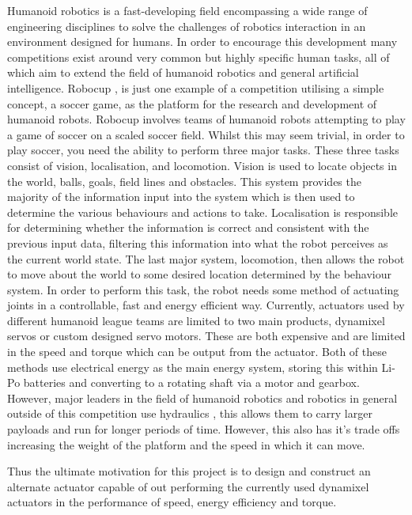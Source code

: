\documentclass[11pt,a4paper]{article}
\begin{document}
Humanoid robotics is a fast-developing field encompassing a wide range of engineering disciplines to solve the challenges of robotics interaction in an environment designed for humans. In order to encourage this development many competitions exist around very common but highly specific human tasks, all of which aim to extend the field of humanoid robotics and general artificial intelligence. Robocup \cite{kitano1995robocup}, is just one example of a competition utilising a simple concept, a soccer game, as the platform for the research and development of humanoid robots. Robocup involves teams of humanoid robots attempting to play a game of soccer on a scaled soccer field. Whilst this may seem trivial, in order to play soccer, you need the ability to perform three major tasks. These three tasks consist of vision, localisation, and locomotion. Vision is used to locate objects in the world, balls, goals, field lines and obstacles. This system provides the majority of the information input into the system which is then used to determine the various behaviours and actions to take. Localisation is responsible for determining whether the information is correct and consistent with the previous input data, filtering this information into what the robot perceives as the current world state. The last major system, locomotion, then allows the robot to move about the world to some desired location determined by the behaviour system. In order to perform this task, the robot needs some method of actuating joints in a controllable, fast and energy efficient way. Currently, actuators used by different humanoid league teams are limited to two main products, dynamixel servos \cite{robotis_mx106} or custom designed servo motors. These are both expensive and are limited in the speed and torque which can be output from the actuator. Both of these methods use electrical energy as the main energy system, storing this within Li-Po batteries and converting to a rotating shaft via a motor and gearbox. However, major leaders in the field of humanoid robotics and robotics in general outside of this competition use hydraulics \cite{atlas}, this allows them to carry larger payloads and run for longer periods of time. However, this also has it's trade offs increasing the weight of the platform and the speed in which it can move. \newline

Thus the ultimate motivation for this project is to design and construct an alternate actuator capable of out performing the currently used dynamixel actuators in the performance of speed, energy efficiency and torque. \newline
\end{document}
